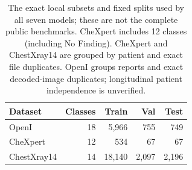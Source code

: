 \begin{table}[t]
\centering
\footnotesize
\setlength{\tabcolsep}{3pt}
\begin{tabular}{@{}lrrrr@{}}
\toprule
Dataset & Classes & Train & Val & Test \\
\midrule
OpenI & 18 & 5,966 & 755 & 749 \\
CheXpert & 12 & 534 & 67 & 67 \\
ChestXray14 & 14 & 18,140 & 2,097 & 2,196 \\
\bottomrule
\end{tabular}
\caption{The exact local subsets and fixed splits used by all seven models; these are not the complete public benchmarks. CheXpert includes 12 classes (including No Finding). CheXpert and ChestXray14 are grouped by patient and exact file duplicates. OpenI groups reports and exact decoded-image duplicates; longitudinal patient independence is unverified.}
\label{tab:token_mlp_dataset_summary}
\end{table}
